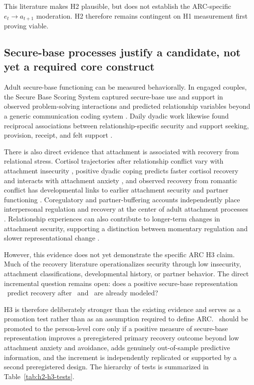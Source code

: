 This literature makes H2 plausible, but does not establish the ARC-specific \(e_t\rightarrow a_{t+1}\) moderation. H2 therefore remains contingent on H1 measurement first proving viable.

\subsection{Secure-base processes justify a candidate, not yet a required core construct}

Adult secure-base functioning can be measured behaviorally. In engaged couples, the Secure Base Scoring System captured secure-base use and support in observed problem-solving interactions and predicted relationship variables beyond a generic communication coding system \parencite{crowell2002securebase}. Daily dyadic work likewise found reciprocal associations between relationship-specific security and support seeking, provision, receipt, and felt support \parencite{davila2009securebase}.

There is also direct evidence that attachment is associated with recovery from relational stress. Cortisol trajectories after relationship conflict vary with attachment insecurity \parencite{powers2006cortisol,pietromonaco2013cortisol}, positive dyadic coping predicts faster cortisol recovery and interacts with attachment anxiety \parencite{meuwly2012cortisol}, and observed recovery from romantic conflict has developmental links to earlier attachment security and partner functioning \parencite{salvatore2011recovery}. Coregulatory and partner-buffering accounts independently place interpersonal regulation and recovery at the center of adult attachment processes \parencite{sbarra2008coregulation,simpson2014buffering,overall2022buffering}. Relationship experiences can also contribute to longer-term changes in attachment security, supporting a distinction between momentary regulation and slower representational change \parencite{arriaga2019security,bayraktaroglu2023positive}.

However, this evidence does not yet demonstrate the specific ARC H3 claim. Much of the recovery literature operationalizes security through low insecurity, attachment classifications, developmental history, or partner behavior. The direct incremental question remains open: does a positive secure-base representation \Sec\ predict recovery after \Anx\ and \Avo\ are already modeled?

H3 is therefore deliberately stronger than the existing evidence and serves as a promotion test rather than as an assumption required to define ARC. \Sec\ should be promoted to the person-level core only if a positive measure of secure-base representation improves a preregistered primary recovery outcome beyond low attachment anxiety and avoidance, adds genuinely out-of-sample predictive information, and the increment is independently replicated or supported by a second preregistered design. The hierarchy of tests is summarized in Table~\ref{tab:h2-h3-tests}.

